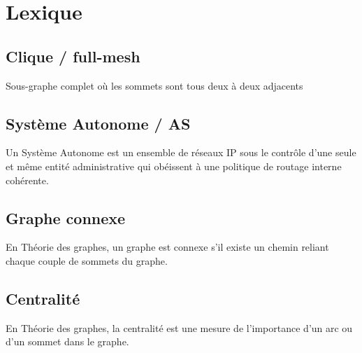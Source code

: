 
% 

\section*{Lexique}

\subsection*{Clique / full-mesh}

Sous-graphe complet o\`u les sommets sont tous deux \`a deux adjacents

\subsection*{Syst\`eme Autonome / AS}

Un Syst\`eme Autonome est un ensemble de r\'eseaux IP sous le contrôle d'une seule et m\^eme entit\'e administrative qui ob\'eissent \`a une politique de routage interne coh\'erente.

\subsection*{Graphe connexe}

En Th\'eorie des graphes, un graphe est connexe s'il existe un chemin reliant chaque couple de sommets du graphe.

\subsection*{Centralit\'e}

En Th\'eorie des graphes, la centralit\'e est une mesure de l'importance d'un arc ou d'un sommet dans le graphe.

% 
